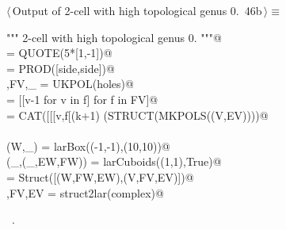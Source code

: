 \documentclass[11pt,oneside]{article}    %
\begin{document}
\begin{flushleft} \small \label{scrap75}
\protect{}$\langle\,$Output of 2-cell with high topological genus 0.\nobreak\ {\footnotesize 46b}$\,\rangle\equiv$
\vspace{-1ex}
\begin{list}{}{} \item
\mbox{}\verb@""" 2-cell with high topological genus 0. """@\\
\mbox{}\verb@side = QUOTE(5*[1,-1])@\\
\mbox{}\verb@holes = PROD([side,side])@\\
\mbox{}\verb@V,FV,_ = UKPOL(holes)@\\
\mbox{}\verb@FV = [[v-1 for v in f] for f in FV]@\\
\mbox{}\verb@EV = CAT([[[v,f[(k+1)%4]] for k,v in enumerate(f+[f[0]][:-1])] for f in FV])@\\
\mbox{}\verb@VIEW(STRUCT(MKPOLS((V,EV))))@\\
\mbox{}\verb@@\\
\mbox{}\verb@(W,_) = larBox((-1,-1),(10,10))@\\
\mbox{}\verb@(_,(_,EW,FW)) = larCuboids((1,1),True)@\\
\mbox{}\verb@complex = Struct([(W,FW,EW),(V,FV,EV)])@\\
\mbox{}\verb@V,FV,EV = struct2lar(complex)@\\
\mbox{}\verb@@{\NWsep}
\end{list}
\vspace{-1ex}
\footnotesize\addtolength{\baselineskip}{-1ex}
\begin{list}{}{\setlength{\itemsep}{-\parsep}\setlength{\itemindent}{-\leftmargin}}
\item \NWtxtMacroRefIn\ .
\end{list}
\end{flushleft}
\end{document}
